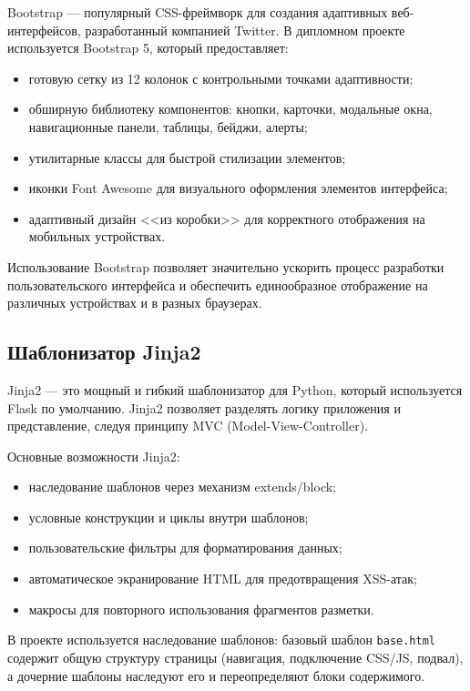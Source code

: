 \documentclass[14pt,a4paper,oneside]{extarticle}
\begin{document}
Bootstrap --- популярный CSS-фреймворк для создания адаптивных веб-интерфейсов, разработанный компанией Twitter. В дипломном проекте используется Bootstrap 5, который предоставляет:
\begin{itemize}[leftmargin=2cm]
    \item готовую сетку из 12 колонок с контрольными точками адаптивности;
    \item обширную библиотеку компонентов: кнопки, карточки, модальные окна, навигационные панели, таблицы, бейджи, алерты;
    \item утилитарные классы для быстрой стилизации элементов;
    \item иконки Font Awesome для визуального оформления элементов интерфейса;
    \item адаптивный дизайн <<из коробки>> для корректного отображения на мобильных устройствах.
\end{itemize}

Использование Bootstrap позволяет значительно ускорить процесс разработки пользовательского интерфейса и обеспечить единообразное отображение на различных устройствах и в разных браузерах.

\subsection{Шаблонизатор Jinja2}

Jinja2 --- это мощный и гибкий шаблонизатор для Python, который используется Flask по умолчанию. Jinja2 позволяет разделять логику приложения и представление, следуя принципу MVC (Model-View-Controller).

Основные возможности Jinja2:
\begin{itemize}[leftmargin=2cm]
    \item наследование шаблонов через механизм extends/block;
    \item условные конструкции и циклы внутри шаблонов;
    \item пользовательские фильтры для форматирования данных;
    \item автоматическое экранирование HTML для предотвращения XSS-атак;
    \item макросы для повторного использования фрагментов разметки.
\end{itemize}

В проекте используется наследование шаблонов: базовый шаблон \texttt{base.html} содержит общую структуру страницы (навигация, подключение CSS/JS, подвал), а дочерние шаблоны наследуют его и переопределяют блоки содержимого.
\end{document}
